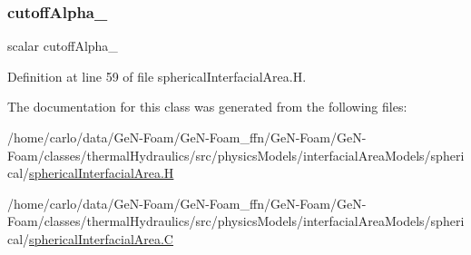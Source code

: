 \subsubsection{\texorpdfstring{cutoff\+Alpha\+\_\+}{cutoffAlpha\_}}
{\footnotesize\ttfamily scalar cutoff\+Alpha\+\_\+\hspace{0.3cm}{\ttfamily [protected]}}



Definition at line 59 of file spherical\+Interfacial\+Area.\+H.



The documentation for this class was generated from the following files\+:\begin{DoxyCompactItemize}
\item 
/home/carlo/data/\+Ge\+N-\/\+Foam/\+Ge\+N-\/\+Foam\+\_\+ffn/\+Ge\+N-\/\+Foam/\+Ge\+N-\/\+Foam/classes/thermal\+Hydraulics/src/physics\+Models/interfacial\+Area\+Models/spherical/\hyperlink{sphericalInterfacialArea_8H}{spherical\+Interfacial\+Area.\+H}\item 
/home/carlo/data/\+Ge\+N-\/\+Foam/\+Ge\+N-\/\+Foam\+\_\+ffn/\+Ge\+N-\/\+Foam/\+Ge\+N-\/\+Foam/classes/thermal\+Hydraulics/src/physics\+Models/interfacial\+Area\+Models/spherical/\hyperlink{sphericalInterfacialArea_8C}{spherical\+Interfacial\+Area.\+C}\end{DoxyCompactItemize}
